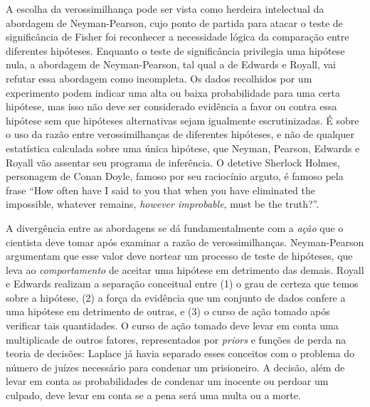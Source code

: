 A escolha da verossimilhança pode ser vista como herdeira intelectual da abordagem de Neyman-Pearson, cujo ponto de partida
para atacar o teste de significância de Fisher foi reconhecer a necessidade lógica da comparação entre diferentes hipóteses.
Enquanto o teste de significância privilegia uma hipótese nula, a abordagem de Neyman-Pearson, tal qual a de Edwards e Royall,
vai refutar essa abordagem como incompleta. Os dados recolhidos por um experimento podem indicar uma alta ou baixa
probabilidade para uma certa hipótese, mas isso não deve ser considerado evidência a favor ou contra essa hipótese sem
que hipóteses alternativas sejam igualmente escrutinizadas. É sobre o uso da razão entre verossimilhanças de diferentes hipóteses,
e não de qualquer estatística calculada sobre uma única hipótese, que Neyman, Pearson, Edwards e Royall vão assentar seu
programa de inferência. O detetive Sherlock Holmes, personagem de Conan Doyle, famoso por seu raciocínio arguto, é famoso
pela frase ``How often have I said to you that when you have eliminated the impossible, whatever remains, {\em however 
improbable}, must be the truth?''.

A divergência entre as abordagens se dá fundamentalmente com a {\em ação} que o cientista deve tomar após examinar a 
razão de verossimilhanças. Neyman-Pearson argumentam que esse valor deve nortear um processo de teste de hipóteses, que
leva ao {\em comportamento} de aceitar uma hipótese em detrimento das demais. Royall e Edwards realizam a separação
conceitual entre (1) o grau de certeza que temos sobre a hipótese, (2) a força da evidência que um conjunto de dados confere
a uma hipótese em detrimento de outras, e (3) o curso de ação tomado após verificar tais quantidades. O curso de ação tomado
deve levar em conta uma multiplicade de outros fatores, representados por {\em priors} e funções de perda na teoria de 
decisões: Laplace já havia separado esses conceitos com o problema do 
número de juízes necessário para condenar um prisioneiro. A decisão, além de levar em conta as probabilidades de
condenar um inocente ou perdoar um culpado, deve levar em conta se a pena será uma multa ou a morte.

